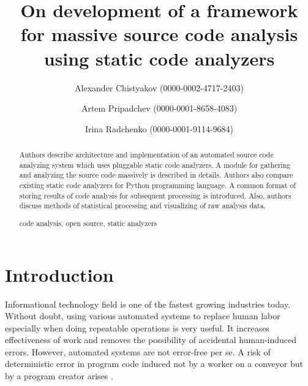 \documentclass[runningheads,a4paper]{llncs}
\newcommand{\keywords}[1]{\par\addvspace\baselineskip
\noindent\keywordname\enspace\ignorespaces#1}
\begin{document}
\mainmatter  %

\title{On development of a framework\\for massive source code analysis\\
using static code analyzers}


\author{Alexander Chistyakov (0000-0002-4717-2403)
\and Artem Pripadchev (0000-0001-8658-4083)\and Irina Radchenko (0000-0001-9114-9684)}
%


\maketitle


\begin{abstract}
  Authors describe architecture and implementation of an automated source code
  analyzing system which uses pluggable static code analyzers. A module for
  gathering and analyzing the source code massively is described in details.
  Authors also compare existing static code analyzers for Python programming
  language. A common format of storing results of code analysis for subsequent
  processing is introduced. Also, authors discuss methods of statistical
  processing and visualizing of raw analysis data.
\keywords{code analysis, open source, static analyzers}
\end{abstract}


\section{Introduction}

Informational technology field is one of the fastest growing industries today.
Without doubt, using various automated systems to replace human labor especially
when doing repeatable operations is very useful. It increases effectiveness
of work and removes the possibility of accidental human-induced errors.
However, automated systems are not error-free per se. A risk of deterministic
error in program code induced not by a worker on a conveyor but by
a program creator arises \cite{item01}.
\end{document}
